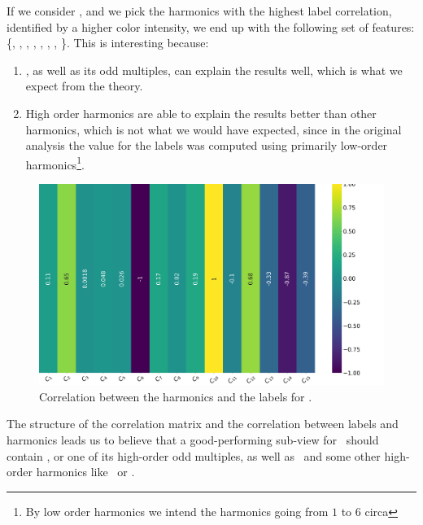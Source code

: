 If we consider , and we pick the harmonics with the highest label correlation,
identified by a higher color intensity, we end up with the following set of features: \{\an[2],
\an[6], \an[10], \an[11], \an[12], \an[13], \an[14], \an[15]\}. This is interesting because:
\begin{enumerate}
	\item \an[2], as well as its odd multiples, can explain the results well, which is what we expect from the theory.
	\item High order harmonics are able to explain the results better than other harmonics,
	      which is not what we would have expected, since in the original analysis the value for the
	      labels was computed using primarily low-order harmonics\footnote{By low order
		      harmonics we intend the harmonics going from $1$ to $6$ circa}.
\end{enumerate}

\begin{figure}[!ht]
	\centering
	\includegraphics[width=\linewidth]{img/An_label_corr.png}
	\caption{Correlation between the harmonics and the labels for \an.} \label{fig:an-lcorr}
\end{figure}

The structure of the correlation matrix and the correlation between labels and harmonics leads us to
believe that a good-performing sub-view for \an\ should contain \an[2], or one of its high-order
odd multiples, as well as \an[15]\ and some other high-order harmonics like \an[11]\ or \an[13].

